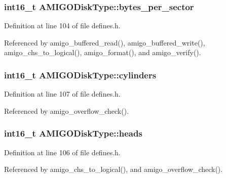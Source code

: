 \subsubsection[{\texorpdfstring{bytes\+\_\+per\+\_\+sector}{bytes_per_sector}}]{\setlength{\rightskip}{0pt plus 5cm}int16\+\_\+t A\+M\+I\+G\+O\+Disk\+Type\+::bytes\+\_\+per\+\_\+sector}\hypertarget{structAMIGODiskType_aaba90c38cd54cffcffefd43955f137c2}{}\label{structAMIGODiskType_aaba90c38cd54cffcffefd43955f137c2}


Definition at line 104 of file defines.\+h.



Referenced by amigo\+\_\+buffered\+\_\+read(), amigo\+\_\+buffered\+\_\+write(), amigo\+\_\+chs\+\_\+to\+\_\+logical(), amigo\+\_\+format(), and amigo\+\_\+verify().

\subsubsection[{\texorpdfstring{cylinders}{cylinders}}]{\setlength{\rightskip}{0pt plus 5cm}int16\+\_\+t A\+M\+I\+G\+O\+Disk\+Type\+::cylinders}\hypertarget{structAMIGODiskType_ae89d76a3143c33f3d61b0465ac2e8fe3}{}\label{structAMIGODiskType_ae89d76a3143c33f3d61b0465ac2e8fe3}


Definition at line 107 of file defines.\+h.



Referenced by amigo\+\_\+overflow\+\_\+check().

\subsubsection[{\texorpdfstring{heads}{heads}}]{\setlength{\rightskip}{0pt plus 5cm}int16\+\_\+t A\+M\+I\+G\+O\+Disk\+Type\+::heads}\hypertarget{structAMIGODiskType_ac24acfa9854cf9333d7aace761a739be}{}\label{structAMIGODiskType_ac24acfa9854cf9333d7aace761a739be}


Definition at line 106 of file defines.\+h.



Referenced by amigo\+\_\+chs\+\_\+to\+\_\+logical(), and amigo\+\_\+overflow\+\_\+check().


